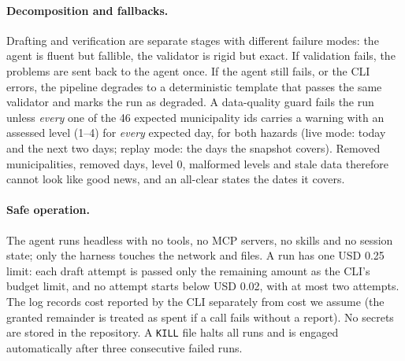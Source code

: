 \documentclass{article}
\begin{document}
\paragraph{Decomposition and fallbacks.} Drafting and verification are separate stages with different failure modes: the agent is fluent but fallible, the validator is rigid but exact. If validation fails, the problems are sent back to the agent once. If the agent still fails, or the CLI errors, the pipeline degrades to a deterministic template that passes the same validator and marks the run as degraded. A data-quality guard fails the run unless \emph{every} one of the 46 expected municipality ids carries a warning with an assessed level (1--4) for \emph{every} expected day, for both hazards (live mode: today and the next two days; replay mode: the days the snapshot covers). Removed municipalities, removed days, level 0, malformed levels and stale data therefore cannot look like good news, and an all-clear states the dates it covers.

\paragraph{Safe operation.} The agent runs headless with no tools, no MCP servers, no skills and no session state; only the harness touches the network and files. A run has one USD 0.25 limit: each draft attempt is passed only the remaining amount as the CLI's budget limit, and no attempt starts below USD 0.02, with at most two attempts. The log records cost reported by the CLI separately from cost we assume (the granted remainder is treated as spent if a call fails without a report). No secrets are stored in the repository. A \texttt{KILL} file halts all runs and is engaged automatically after three consecutive failed runs.
\end{document}
